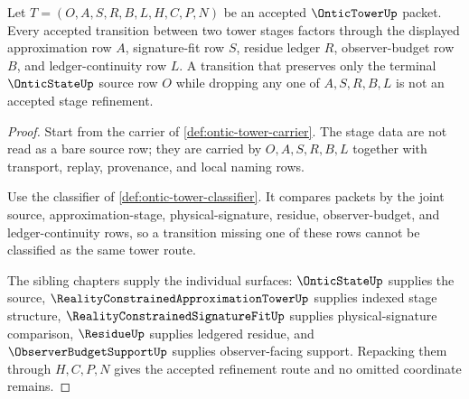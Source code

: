 \begin{theorem}
\label{thm:ontic-tower-stage-refinement}
Let $T=(O,A,S,R,B,L,H,C,P,N)$ be an accepted $\OnticTowerUp$ packet. Every accepted transition between two tower stages factors through the displayed approximation row $A$, signature-fit row $S$, residue ledger $R$, observer-budget row $B$, and ledger-continuity row $L$. A transition that preserves only the terminal $\OnticStateUp$ source row $O$ while dropping any one of $A,S,R,B,L$ is not an accepted stage refinement.
\end{theorem}
\begin{proof}
Start from the carrier of \autoref{def:ontic-tower-carrier}. The stage data are not read as a bare source row; they are carried by $O,A,S,R,B,L$ together with transport, replay, provenance, and local naming rows.

Use the classifier of \autoref{def:ontic-tower-classifier}. It compares packets by the joint source, approximation-stage, physical-signature, residue, observer-budget, and ledger-continuity rows, so a transition missing one of these rows cannot be classified as the same tower route.

The sibling chapters supply the individual surfaces: $\OnticStateUp$ supplies the source, $\RealityConstrainedApproximationTowerUp$ supplies indexed stage structure, $\RealityConstrainedSignatureFitUp$ supplies physical-signature comparison, $\ResidueUp$ supplies ledgered residue, and $\ObserverBudgetSupportUp$ supplies observer-facing support. Repacking them through $H,C,P,N$ gives the accepted refinement route and no omitted coordinate remains.
\end{proof}

